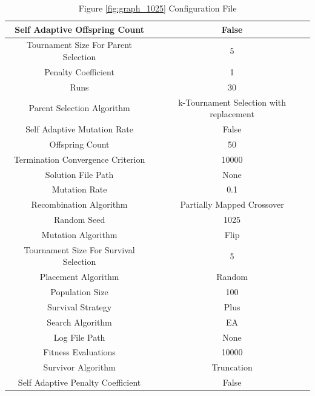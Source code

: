 \documentclass{standalone}
\begin{document}
\begin{table}[!htb]
	\centering
	\caption{Figure \ref{fig:graph_1025} Configuration File}
	\label{tab:graph_1025}
	\begin{tabular}{| c | c |}
		\hline
		Self Adaptive Offspring Count		& False		 \\
		\hline
		Tournament Size For Parent Selection		& 5		 \\
		\hline
		Penalty Coefficient		& 1		 \\
		\hline
		Runs		& 30		 \\
		\hline
		Parent Selection Algorithm		& k-Tournament Selection with replacement		 \\
		\hline
		Self Adaptive Mutation Rate		& False		 \\
		\hline
		Offspring Count		& 50		 \\
		\hline
		Termination Convergence Criterion		& 10000		 \\
		\hline
		Solution File Path		& None		 \\
		\hline
		Mutation Rate		& 0.1		 \\
		\hline
		Recombination Algorithm		& Partially Mapped Crossover		 \\
		\hline
		Random Seed		& 1025		 \\
		\hline
		Mutation Algorithm		& Flip		 \\
		\hline
		Tournament Size For Survival Selection		& 5		 \\
		\hline
		Placement Algorithm		& Random		 \\
		\hline
		Population Size		& 100		 \\
		\hline
		Survival Strategy		& Plus		 \\
		\hline
		Search Algorithm		& EA		 \\
		\hline
		Log File Path		& None		 \\
		\hline
		Fitness Evaluations		& 10000		 \\
		\hline
		Survivor Algorithm		& Truncation		 \\
		\hline
		Self Adaptive Penalty Coefficient		& False		 \\
		\hline
	\end{tabular}
\end{table}
\end{document}
